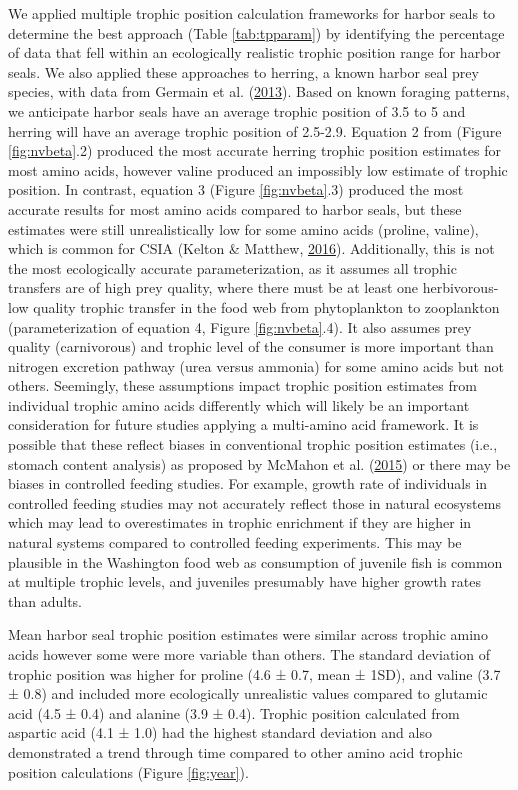 \documentclass [11pt, proquest] {uwthesis}[2015/03/03]
\begin{document}
We applied multiple trophic position calculation frameworks for harbor
seals to determine the best approach (Table \ref{tab:tpparam}) by
identifying the percentage of data that fell within an ecologically
realistic trophic position range for harbor seals. We also applied these
approaches to herring, a known harbor seal prey species, with data from
Germain et al. (\protect\hyperlink{ref-Germain2013}{2013}). Based on
known foraging patterns, we anticipate harbor seals have an average
trophic position of 3.5 to 5 and herring will have an average trophic
position of 2.5-2.9. Equation 2 from (Figure \ref{fig:nvbeta}.2)
produced the most accurate herring trophic position estimates for most
amino acids, however valine produced an impossibly low estimate of
trophic position. In contrast, equation 3 (Figure \ref{fig:nvbeta}.3)
produced the most accurate results for most amino acids compared to
harbor seals, but these estimates were still unrealistically low for
some amino acids (proline, valine), which is common for CSIA (Kelton \&
Matthew, \protect\hyperlink{ref-McMahon2016}{2016}). Additionally, this
is not the most ecologically accurate parameterization, as it assumes
all trophic transfers are of high prey quality, where there must be at
least one herbivorous-low quality trophic transfer in the food web from
phytoplankton to zooplankton (parameterization of equation 4, Figure
\ref{fig:nvbeta}.4). It also assumes prey quality (carnivorous) and
trophic level of the consumer is more important than nitrogen excretion
pathway (urea versus ammonia) for some amino acids but not others.
Seemingly, these assumptions impact trophic position estimates from
individual trophic amino acids differently which will likely be an
important consideration for future studies applying a multi-amino acid
framework. It is possible that these reflect biases in conventional
trophic position estimates (i.e., stomach content analysis) as proposed
by McMahon et al. (\protect\hyperlink{ref-McMahon2015}{2015}) or there
may be biases in controlled feeding studies. For example, growth rate of
individuals in controlled feeding studies may not accurately reflect
those in natural ecosystems which may lead to overestimates in trophic
enrichment if they are higher in natural systems compared to controlled
feeding experiments. This may be plausible in the Washington food web as
consumption of juvenile fish is common at multiple trophic levels, and
juveniles presumably have higher growth rates than adults.

Mean harbor seal trophic position estimates were similar across trophic
amino acids however some were more variable than others. The standard
deviation of trophic position was higher for proline (4.6 ± 0.7, mean ±
1SD), and valine (3.7 ± 0.8) and included more ecologically unrealistic
values compared to glutamic acid (4.5 ± 0.4) and alanine (3.9 ± 0.4).
Trophic position calculated from aspartic acid (4.1 ± 1.0) had the
highest standard deviation and also demonstrated a trend through time
compared to other amino acid trophic position calculations (Figure
\ref{fig:year}).
\end{document}
